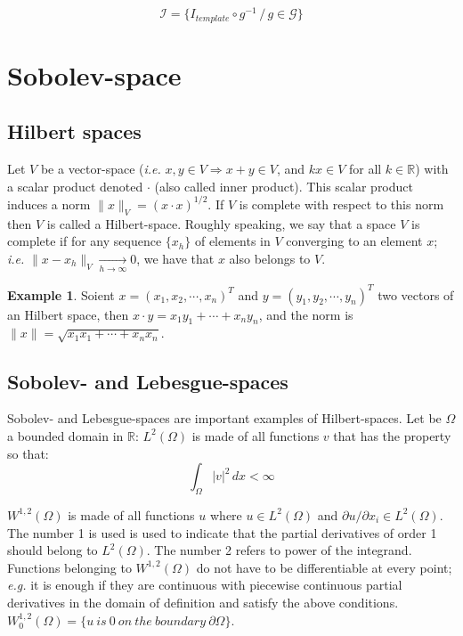 \documentclass[final, paper=letter,5p,times,twocolumn]{elsarticle}
\theoremstyle{definition}
\newtheorem{example}[theorem]{Example} %
\begin{document}
$$
\mathcal{I} = \{ I_{template} \circ g^{-1} \, / \, g \in \mathcal{G} \}
$$


\section{Sobolev-space}


\subsection{Hilbert spaces}

Let $V$ be a vector-space ({\it i.e.} $x, y \in V \Rightarrow x + y \in V$, and $kx \in V$ for all $k \in \mathbb{R}$) with a scalar product denoted $\cdot$ (also called inner product). This scalar product induces a norm $\| x \|_{V} = (x \cdot x)^{1/2}$. If $V$ is complete with respect to this norm then $V$ is called a Hilbert-space. Roughly speaking, we say that a space $V$ is complete if for any sequence $\{ x_{h} \}$ of elements in $V$ converging to an element $x$; {\it i.e.} $ \| x - x_{h}\|_{V} \underset{h \rightarrow \infty}{\rightarrow} 0$, we have that $x$ also belongs to $V$.

\begin{example}
  Soient $x = (x_{1}, x_{2}, \cdots, x_{n})^{T}$ and $y = (y_{1}, y_{2}, \cdots, y_{n})^{T}$ two vectors of an Hilbert space, then $x \cdot y = x_{1}y_{1} + \cdots + x_{n}y_{n}$, and the norm is $\| x \| = \sqrt{x_{1}x_{1} + \cdots + x_{n}x_{n}}$.
\end{example}
  

\subsection{Sobolev- and Lebesgue-spaces}

Sobolev- and Lebesgue-spaces are important examples of Hilbert-spaces. Let be $\Omega$ a bounded domain in $\mathbb{R}$: $L^{2}(\Omega)$ is made of all functions $v$ that has the property so that: \\

$$
\int_{\Omega} |v|^{2} \, dx < \infty
$$

$W^{1,2}(\Omega)$ is made of all functions $u$ where $u \in L^{2}(\Omega)$ and $\partial u / \partial x_{i} \in L^{2}(\Omega)$. The number 1 is used is used to indicate that the partial derivatives of order 1 should belong to $L^{2}(\Omega)$. The number 2 refers to power of the integrand. Functions belonging to $W^{1,2}(\Omega)$ do not have to be differentiable at every point; {\it e.g.} it is enough if they are continuous with piecewise continuous partial derivatives in the domain of definition and satisfy the above conditions. $W^{1,2}_{0}(\Omega) = \{ u~is~0~on~the~boundary~\partial \Omega\}$.\\
\end{document}
